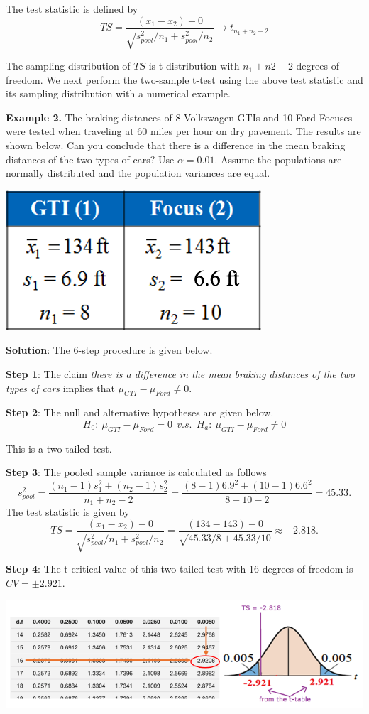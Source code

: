 \documentclass[
]{book}
\begin{document}
The test statistic is defined by
\[
TS = \frac{(\bar{x}_1 -\bar{x}_2)-0}{\sqrt{s_{pool}^2/n_1 + s_{pool}^2/n_2}} \to t_{n_1+n_2-2}
\]

The sampling distribution of \(TS\) is t-distribution with \(n_1+n2-2\) degrees of freedom. We next perform the two-sample t-test using the above test statistic and its sampling distribution with a numerical example.

\hfill\break

\textbf{Example 2.} The braking distances of 8 Volkswagen GTIs and 10 Ford Focuses were tested when traveling at 60 miles per hour on dry pavement. The results are shown below. Can you conclude that there is a difference in the mean braking distances of the two types of cars? Use \(\alpha = 0.01\). Assume the populations are normally distributed and the population variances are equal.

\includegraphics[width=0.25\linewidth]{week11/example02Data}

\textbf{Solution}: The 6-step procedure is given below.

\textbf{Step 1}: The claim \emph{there is a difference in the mean braking distances of the two types of cars} implies that \(\mu_{GTI} - \mu_{Ford} \ne 0\).

\textbf{Step 2}: The null and alternative hypotheses are given below.
\[
H_0: \ \mu_{GTI} - \mu_{Ford} = 0 \ \ v.s.  \ \ H_a: \ \mu_{GTI} - \mu_{Ford} \ne 0
\]

This is a two-tailed test.

\textbf{Step 3}: The pooled sample variance is calculated as follows
\[
s_{pool}^2 = \frac{(n_1-1)s_1^2 + (n_2-1)s_2^2}{n_1 + n_2 -2} = \frac{(8-1)6.9^2 + (10-1)6.6^2}{8 + 10 -2}=45.33.
\]
The test statistic is given by
\[
TS = \frac{(\bar{x}_1 -\bar{x}_2)-0}{\sqrt{s_{pool}^2/n_1 + s_{pool}^2/n_2}} = \frac{(134 -143)-0}{\sqrt{45.33/8 + 45.33/10}} \approx -2.818.
\]

\textbf{Step 4}: The t-critical value of this two-tailed test with 16 degrees of freedom is \(CV = \pm 2.921\).

\includegraphics[width=0.7\linewidth]{week11/example02}
\end{document}
